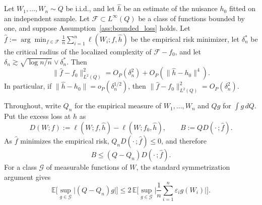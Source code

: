 \label{thm:excess_risk}
Let $W_1, \dots, W_n \sim Q$ be i.i.d., and let $\hat{h}$ be an estimate of the nuisance $h_0$ fitted on an independent sample. Let $\mathcal{F} \subset L^\infty(Q)$ be a class of functions bounded by one, and suppose Assumption~\ref{ass:bounded_loss} holds. Let $\hat{f} := \arg\min_{f \in \mathcal{F}}\frac{1}{n}\sum_{i = 1}^n \ell(W_i; f, \hat{h})$ be the empirical risk minimizer, let $\delta_n^\ast$ be the critical radius of the localized complexity of $\mathcal{F} - f_0$, and let $\delta_n \gtrsim \sqrt{\log n/n} \lor \delta_n^\ast$.
Then
\[
\|\hat f - f_0\|_{L^2(Q)}^2 = O_P(\delta_n^2) + O_P\left(\|\hat h - h_0\|^4\right).
\]
In particular, if $\|\hat h - h_0\| = o_P(\delta_n^{1/2})$, then
$\|\hat f - f_0\|_{L^2(Q)}^2 = O_P(\delta_n^2)$.

Throughout, write $Q_n$ for the empirical measure of $W_1, \dots, W_n$ and $Qg$ for $\int g \, dQ$.
Put the excess loss at $\hat h$ as
\[
D(W; f) := \ell(W; f, \hat h) - \ell(W; f_0, \hat h),
\qquad
B := Q D(\cdot\,; \hat f).
\]
As $\hat f$ minimizes the empirical risk, $Q_n D(\cdot\,; \hat f) \le 0$, and therefore
\begin{equation}\label{eq:B-basic}
B \le (Q - Q_n) D(\cdot\,; \hat f).
\end{equation}
For a class $\mathcal G$ of measurable functions of $W$, the standard symmetrization argument \citep{wainwright2019high} gives
\[
\mathbb{E}\Big[\sup_{g \in \mathcal G}\big|(Q - Q_n) g\big|\Big]
\le
2\, \mathbb{E}\Big[\sup_{g \in \mathcal G}\Big|\frac1n\sum_{i = 1}^n \varepsilon_i g(W_i)\Big|\Big].
\]


